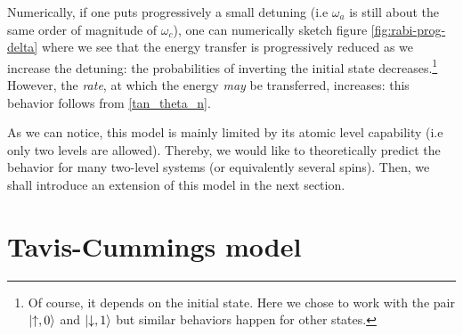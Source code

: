 \documentclass[11pt]{report}
\DeclarePairedDelimiter\ket{\lvert}{\rangle}
\begin{document}
Numerically, if one puts progressively a small detuning (i.e $\omega_a$ is still about the same order of magnitude of $\omega_c$), one can numerically sketch figure \ref{fig:rabi-prog-delta} where we see that the energy transfer is progressively reduced as we increase the detuning: the probabilities of inverting the initial state decreases.\footnote{Of course, it depends on the initial state. Here we chose to work with the pair $\ket{\uparrow, 0}$ and $\ket{\downarrow, 1}$ but similar behaviors happen for other states.} However, the \textit{rate}, at which the energy \textit{may} be transferred, increases: this behavior follows from \eqref{tan_theta_n}.

As we can notice, this model is mainly limited by its atomic level capability (i.e only two levels are allowed). Thereby, we would like to theoretically predict the behavior for many two-level systems (or equivalently several spins). Then, we shall introduce an extension of this model in the next section.

\section{Tavis-Cummings model}
\end{document}
